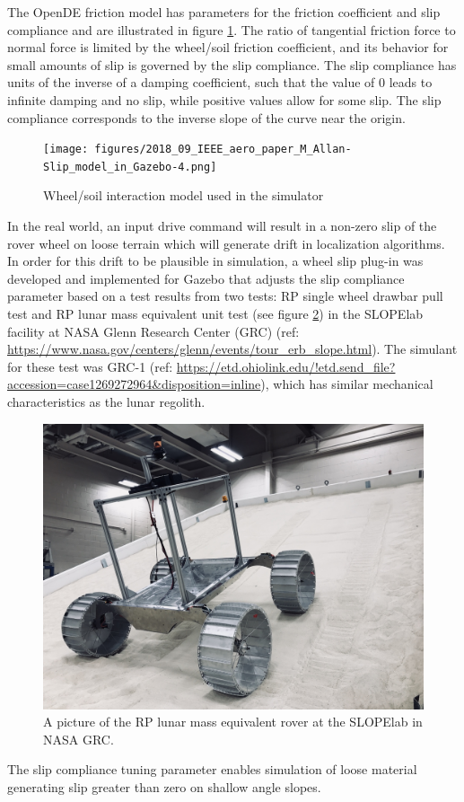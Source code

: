 \documentclass[twocolumn,letterpaper]{IEEEAerospaceCLS}  %
\begin{document}
The OpenDE friction model has parameters for the friction coefficient and slip compliance
and are illustrated in figure \ref{fig:wheelsoilmodel}.
The ratio of tangential friction force to normal force is limited by the wheel/soil friction coefficient,
and its behavior for small amounts of slip is governed by the slip compliance.
The slip compliance has units of the inverse of a damping coefficient,
such that the value of 0 leads to infinite damping and no slip,
while positive values allow for some slip.
The slip compliance corresponds to the inverse slope of the curve near the origin.

\begin{figure}[h!]
    \texttt{[image: figures/2018\_09\_IEEE\_aero\_paper\_M\_Allan-Slip\_model\_in\_Gazebo-4.png]}
    \caption{Wheel/soil interaction model used in the simulator}
    \label{fig:wheelsoilmodel}
\end{figure}

In the real world, an input drive command will result in a non-zero slip of the rover wheel on loose terrain which will generate drift in localization algorithms.
In order for this drift to be plausible in simulation, a wheel slip plug-in was developed and implemented for Gazebo that adjusts the slip compliance parameter based on a test results from two tests: RP single wheel drawbar pull test and RP lunar mass equivalent unit test (see figure \ref{fig:mgru}) in the SLOPElab facility at NASA Glenn Research Center (GRC) (ref: \url{https://www.nasa.gov/centers/glenn/events/tour_erb_slope.html}). 
The simulant for these test was GRC-1 (ref: \url{https://etd.ohiolink.edu/!etd.send_file?accession=case1269272964&disposition=inline}), which has similar mechanical characteristics as the lunar regolith.
\begin{figure}[h!]
	\includegraphics[width=\columnwidth]{figures/wheel_slip_MGRU.JPG}
   	\caption{A picture of the RP lunar mass equivalent rover at the SLOPElab in NASA GRC.}
    \label{fig:mgru}
\end{figure}
The slip compliance tuning parameter enables simulation of loose material generating slip greater than zero on shallow angle slopes.
\end{document}
